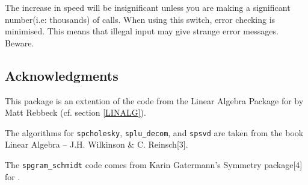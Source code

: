 The increase in speed will be insignificant unless you are making a
significant number(i.e: thousands) of calls. When using this switch,
error checking is minimised. This means that illegal input may give
strange error messages. Beware.

\subsection{Acknowledgments}
This package is an extention of the code from the Linear Algebra Package
for \REDUCE{} by Matt Rebbeck (cf. section \ref{LINALG}).

The algorithms for \texttt{spcholesky}, \texttt{splu\_decom}, and \texttt{spsvd} are
taken from the book Linear Algebra -- J.H. Wilkinson \& C. Reinsch[3].

The \texttt{spgram\_schmidt} code comes from Karin Gatermann's Symmetry
package[4] for {\REDUCE}.
